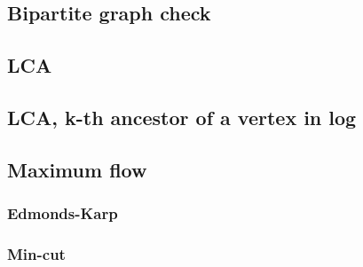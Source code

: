 \subsection{Bipartite graph check}


\subsection{LCA}


\subsection{LCA, k-th ancestor of a vertex in log}


\subsection{Maximum flow}

\subsubsection{Edmonds-Karp}


\subsubsection{Min-cut}

